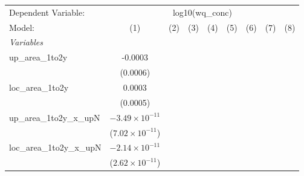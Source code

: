 
\begingroup
\centering
\begin{tabular}{lcccccccc}
   \tabularnewline \midrule \midrule
   Dependent Variable: & \multicolumn{8}{c}{log10(wq\_conc)}\\
   Model:                       & (1)                      & (2)                      & (3)                      & (4)                      & (5)                           & (6)                      & (7)                      & (8)\\  
   \midrule
   \emph{Variables}\\
   up\_area\_1to2y              & -0.0003                  &                          &                          &                          &                               &                          &                          &   \\   
                                & (0.0006)                 &                          &                          &                          &                               &                          &                          &   \\   
   loc\_area\_1to2y             & 0.0003                   &                          &                          &                          &                               &                          &                          &   \\   
                                & (0.0005)                 &                          &                          &                          &                               &                          &                          &   \\   
   up\_area\_1to2y\_x\_upN      & $-3.49\times 10^{-11}$   &                          &                          &                          &                               &                          &                          &   \\   
                                & ($7.02\times 10^{-11}$)  &                          &                          &                          &                               &                          &                          &   \\   
   loc\_area\_1to2y\_x\_upN     & $-2.14\times 10^{-11}$   &                          &                          &                          &                               &                          &                          &   \\   
                                & ($2.62\times 10^{-11}$)  &                          &                          &                          &                               &                          &                          &   \\   

\end{tabular}
